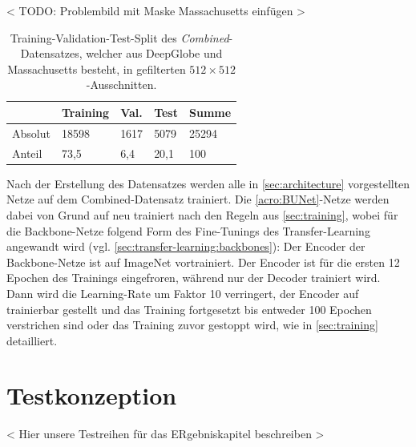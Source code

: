 < TODO: Problembild mit Maske Massachusetts einfügen > 

\begin{table}[ht]
	\centering
	\begin{tabular}{l|l|l|l|l}
		& Training & Val. & Test & Summe \\
		\midrule
		Absolut & 18598 & 1617 & 5079 & 25294 \\
		Anteil & 73,5 & 6,4 & 20,1 & 100 \\ 
	\end{tabular}
	\caption{Training-Validation-Test-Split des \textit{Combined}-Datensatzes, welcher aus DeepGlobe und Massachusetts besteht, 
	in gefilterten $512 \times 512$-Ausschnitten.}
	\label{tab:combined-split}
\end{table}

Nach der Erstellung des Datensatzes werden alle in \autoref{sec:architecture} vorgestellten Netze
auf dem Combined-Datensatz trainiert. 
Die \autoref{acro:BUNet}-Netze werden dabei von Grund auf neu trainiert nach den Regeln aus \autoref{sec:training}, 
wobei für die Backbone-Netze folgend Form des Fine-Tunings des Transfer-Learning angewandt wird (vgl. \autoref{sec:transfer-learning:backbones}): 
Der Encoder der Backbone-Netze ist auf ImageNet vortrainiert. Der Encoder ist für die ersten 12 Epochen des Trainings eingefroren, 
während nur der Decoder trainiert wird. Dann  wird die Learning-Rate um Faktor 10 verringert, der Encoder 
auf trainierbar gestellt und das Training fortgesetzt bis entweder 100 Epochen verstrichen sind oder das Training 
zuvor gestoppt wird, wie in \autoref{sec:training} detailliert.    

\section{Testkonzeption}

< Hier unsere Testreihen für das ERgebniskapitel beschreiben > 


